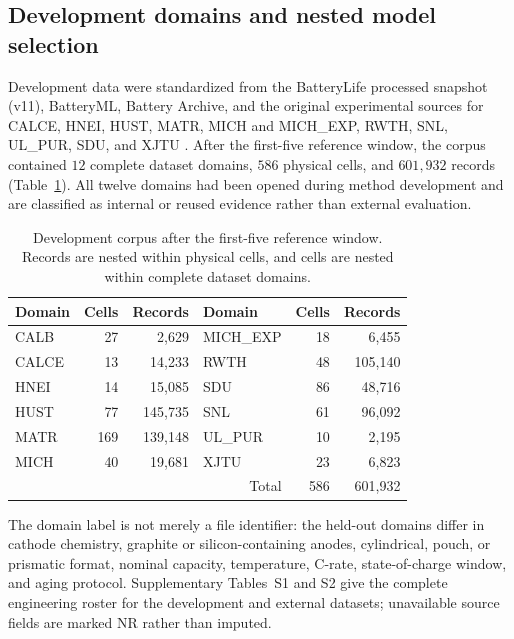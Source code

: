 \documentclass[preprint,12pt]{elsarticle}
\begin{document}
\subsection{Development domains and nested model selection}

Development data were standardized from the BatteryLife processed snapshot (v11), BatteryML, Battery Archive, and the original experimental sources for CALCE, HNEI, HUST, MATR, MICH and MICH\_EXP, RWTH, SNL, UL\_PUR, SDU, and XJTU \citep{zhang2024batteryml,tan2025batterylife,batterylife2026processed,batteryarchive,xing2013ensemble,devie2018variability,ma2022personalized,severson2019cyclelife,attia2020closedloop,weng2021formation,li2021oneshot,preger2020degradation,juarezrobles2020safety,wang2025sorting,wang2024pinn}. After the first-five reference window, the corpus contained $12$ complete dataset domains, $586$ physical cells, and $601{,}932$ records (Table~\ref{tab:data}). All twelve domains had been opened during method development and are classified as internal or reused evidence rather than external evaluation.

\begin{table}[H]
\centering
\caption{Development corpus after the first-five reference window. Records are nested within physical cells, and cells are nested within complete dataset domains.}
\label{tab:data}
\begin{tabular}{lrr@{\qquad}lrr}
\toprule
Domain & Cells & Records & Domain & Cells & Records \\
\midrule
CALB & 27 & 2,629 & MICH\_EXP & 18 & 6,455 \\
CALCE & 13 & 14,233 & RWTH & 48 & 105,140 \\
HNEI & 14 & 15,085 & SDU & 86 & 48,716 \\
HUST & 77 & 145,735 & SNL & 61 & 96,092 \\
MATR & 169 & 139,148 & UL\_PUR & 10 & 2,195 \\
MICH & 40 & 19,681 & XJTU & 23 & 6,823 \\
\midrule
\multicolumn{4}{r}{Total} & 586 & 601,932 \\
\bottomrule
\end{tabular}
\end{table}

The domain label is not merely a file identifier: the held-out domains differ in cathode chemistry, graphite or silicon-containing anodes, cylindrical, pouch, or prismatic format, nominal capacity, temperature, C-rate, state-of-charge window, and aging protocol. Supplementary Tables~S1 and S2 give the complete engineering roster for the development and external datasets; unavailable source fields are marked NR rather than imputed.
\end{document}

